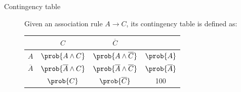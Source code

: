 \begin{description}
    \item[Contingency table] 
        Given an association rule $A \rightarrow C$, its contingency table is defined as:
        \begin{center}
            \def\arraystretch{1.1}
            \begin{tabular}{c|c|c|c}
                & $C$ & $\overline{C}$ & \\
                \hline
                $A$ & $\prob{A \land C}$ & $\prob{A \land \overline{C}}$ & $\prob{A}$ \\
                \hline
                $\overline{A}$ & $\prob{\overline{A} \land C}$ & $\prob{\overline{A} \land \overline{C}}$ & $\prob{\overline{A}}$ \\
                \hline
                & $\prob{C}$ & $\prob{\overline{C}}$ & 100 \\
            \end{tabular}
        \end{center}
\end{description}


